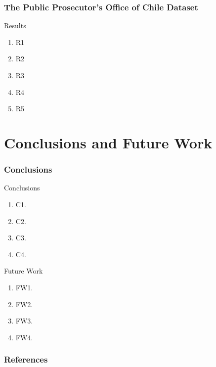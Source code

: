 \documentclass[aspectratio=169]{beamer}
\begin{document}
\begin{frame}
\frametitle{The Public Prosecutor’s Office of Chile Dataset}
\begin{block}{Results}
  \begin{enumerate}
    \item R1
    \item R2
    \item R3
    \item R4
    \item R5
  \end{enumerate}
\end{block}
\vfill

\end{frame}

\section[Conclusions and Future Work]{Conclusions and Future Work}
\begin{frame}
\frametitle{Conclusions}
  \begin{block}{Conclusions}
    \begin{enumerate}
      \item C1.
      \item C2.
      \item C3.
      \item C4.
    \end{enumerate}
  \end{block}
  \begin{block}{Future Work}
    \begin{enumerate}
      \item FW1.
      \item FW2.
      \item FW3.
      \item FW4.
    \end{enumerate}
  \end{block}
\end{frame}

\begin{frame}[allowframebreaks]
  \frametitle{References}
  \footnotesize
  
\end{frame}
\end{document}

